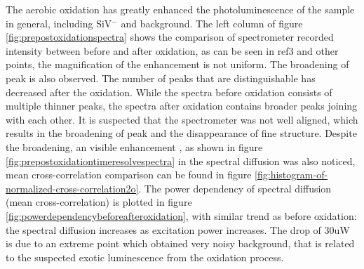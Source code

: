 The aerobic oxidation has greatly enhanced the photoluminescence of the sample in general, including SiV$^{-}$ and background. The left column of figure \ref{fig:prepostoxidationspectra} shows the comparison of spectrometer recorded intensity between before and after oxidation, as can be seen in ref3 and other points, the magnification of the enhancement is not uniform. The broadening of peak is also observed. The number of peaks that are distinguishable has decreased after the oxidation. While the spectra before oxidation consists of multiple thinner peaks, the spectra after oxidation contains broader peaks joining with each other. It is suspected that the spectrometer was not well aligned, which results in the broadening of peak  and the disappearance of fine structure. Despite the broadening, an visible enhancement , as shown in figure \ref{fig:prepostoxidationtimeresolvespectra} in the spectral diffusion was also noticed, mean cross-correlation comparison can be found in figure \ref{fig:histogram-of-normalized-cross-correlation2o}. The power dependency of spectral diffusion (mean cross-correlation) is plotted in figure \ref{fig:powerdependencybeforeafteroxidation}, with similar trend as before oxidation: the spectral diffusion increases as excitation power increases. The drop of 30uW is due to an extreme point which obtained very noisy background, that is related to the suspected exotic luminescence from the oxidation process. 

